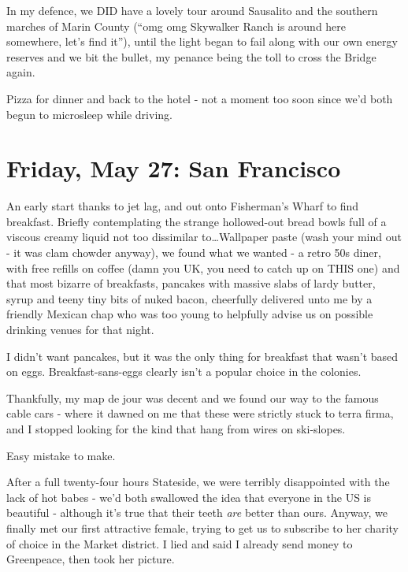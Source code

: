 \documentclass[a5paper,titlepage,draft]{book}
\begin{document}
In my defence, we DID have a lovely tour around Sausalito and the southern marches of Marin County (``omg omg Skywalker Ranch is around here somewhere, let's find it''), until the light began to fail along with our own energy reserves and we bit the bullet, my penance being the toll to cross the Bridge again.

Pizza for dinner and back to the hotel - not a moment too soon since we'd both begun to microsleep while driving.

\chapter[San Francisco]{Friday, May 27: San Francisco}
An early start thanks to jet lag, and out onto Fisherman's Wharf to find breakfast.  Briefly contemplating the strange hollowed-out bread bowls full of a viscous creamy liquid not too dissimilar to\ldots  Wallpaper paste (wash your mind out - it was clam chowder anyway), we found what we wanted - a retro 50s diner, with free refills on coffee (damn you UK, you need to catch up on THIS one) and that most bizarre of breakfasts, pancakes with massive slabs of lardy butter, syrup and teeny tiny bits of nuked bacon, cheerfully delivered unto me by a friendly Mexican chap who was too young to helpfully advise us on possible drinking venues for that night.

I didn't want pancakes, but it was the only thing for breakfast that wasn't based on eggs.  Breakfast-sans-eggs clearly isn't a popular choice in the colonies.

Thankfully, my map de jour was decent and we found our way to the famous cable cars - where it dawned on me that these were strictly stuck to terra firma, and I stopped looking for the kind that hang from wires on ski-slopes.

Easy mistake to make.

After a full twenty-four hours Stateside, we were terribly disappointed with the lack of hot babes - we'd both swallowed the idea that everyone in the US is beautiful - although it's true that their teeth \emph{are} better than ours.  Anyway, we finally met our first attractive female, trying to get us to subscribe to her charity of choice in the Market district.  I lied and said I already send money to Greenpeace, then took her picture.
\end{document}
